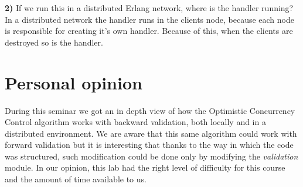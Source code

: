 \documentclass[a4paper, 11pt]{article}
\begin{document}
%
\textbf{2)} If we run this in a distributed Erlang network, where is the handler running?\\

In a distributed network the handler runs in the clients node, because each node is responsible for creating it's own handler. Because of this, when the clients are destroyed so is the handler.\\

\newpage
\section{Personal opinion}
During this seminar we got an in depth view of how the Optimistic Concurrency Control algorithm works with backward validation, both locally and in a distributed environment. We are aware that this same algorithm could work with forward validation but it is interesting that thanks to the way in which the code was structured, such modification could be done only by modifying the \textit{validation} module. In our opinion, this lab had the right level of difficulty for this course and the amount of time available to us. \\
\end{document}
